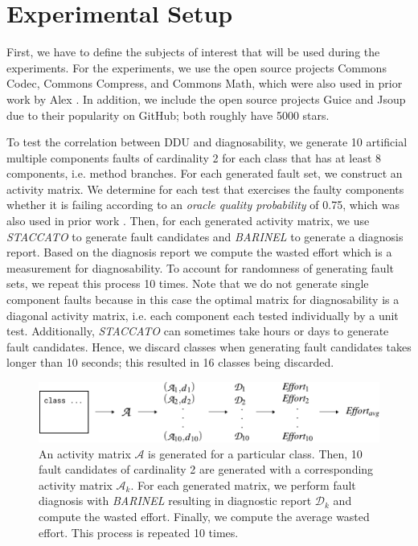 \documentclass[twoside,a4paper,11pt]{memoir}
\begin{document}
\section{Experimental Setup}
\label{sec:rq2_experimental_setup}
First, we have to define the subjects of interest that will be used during the experiments.
For the experiments, we use the open source projects Commons Codec, Commons Compress, and Commons Math, which were also used in prior work by Alex \etal \cite{DBLP:conf/icse/PerezAD17}.
In addition, we include the open source projects Guice and Jsoup due to their popularity on GitHub; both roughly have 5000 stars.

To test the correlation between DDU and diagnosability, we generate 10 artificial multiple components faults of cardinality 2 for each class that has at least 8 components, i.e. method branches.
For each generated fault set, we construct an activity matrix.
We determine for each test that exercises the faulty components whether it is failing according to an \emph{oracle quality probability} of 0.75, which was also used in prior work \cite{DBLP:conf/icse/PerezAD17}.
Then, for each generated activity matrix, we use \emph{STACCATO} to generate fault candidates and \emph{BARINEL} to generate a diagnosis report.
Based on the diagnosis report we compute the wasted effort which is a measurement for diagnosability.
To account for randomness of generating fault sets, we repeat this process 10 times.
Note that we do not generate single component faults because in this case the optimal matrix for diagnosability is a diagonal activity matrix, i.e. each component each tested individually by a unit test.
Additionally, \emph{STACCATO} can sometimes take hours or days to generate fault candidates.
Hence, we discard classes when generating fault candidates takes longer than 10 seconds; this resulted in 16 classes being discarded.

\begin{figure}
  \includegraphics[width=\linewidth]{figures/effort_approach}
  \caption{An activity matrix $\mathcal{A}$ is generated for a particular class. Then, 10 fault candidates of cardinality 2 are generated with a corresponding activity matrix $\mathcal{A}_k$. For each generated matrix, we perform fault diagnosis with \emph{BARINEL} resulting in diagnostic report $\mathcal{D}_k$ and compute the wasted effort. Finally, we compute the average wasted effort. This process is repeated 10 times.}
  \label{fig:fault_generation}
\end{figure}
\end{document}
